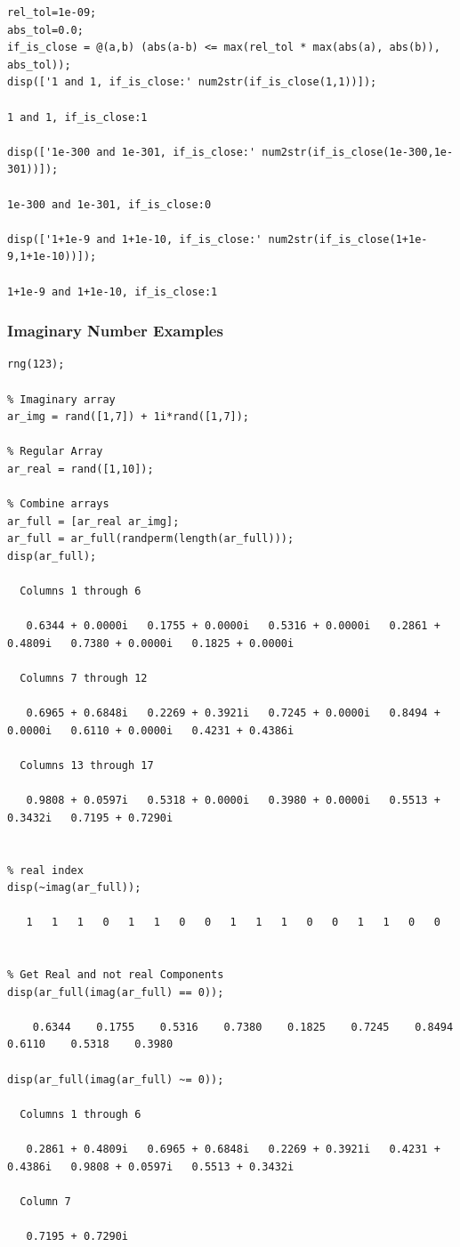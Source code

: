 \documentclass[
]{book}
\begin{document}
\begin{verbatim}
rel_tol=1e-09;
abs_tol=0.0;
if_is_close = @(a,b) (abs(a-b) <= max(rel_tol * max(abs(a), abs(b)), abs_tol));
disp(['1 and 1, if_is_close:' num2str(if_is_close(1,1))]);

1 and 1, if_is_close:1

disp(['1e-300 and 1e-301, if_is_close:' num2str(if_is_close(1e-300,1e-301))]);

1e-300 and 1e-301, if_is_close:0

disp(['1+1e-9 and 1+1e-10, if_is_close:' num2str(if_is_close(1+1e-9,1+1e-10))]);

1+1e-9 and 1+1e-10, if_is_close:1
\end{verbatim}

\hypertarget{imaginary-number-examples}{%
\subsubsection{Imaginary Number Examples}\label{imaginary-number-examples}}

\begin{verbatim}
rng(123);

% Imaginary array
ar_img = rand([1,7]) + 1i*rand([1,7]);

% Regular Array
ar_real = rand([1,10]);

% Combine arrays
ar_full = [ar_real ar_img];
ar_full = ar_full(randperm(length(ar_full)));
disp(ar_full);

  Columns 1 through 6

   0.6344 + 0.0000i   0.1755 + 0.0000i   0.5316 + 0.0000i   0.2861 + 0.4809i   0.7380 + 0.0000i   0.1825 + 0.0000i

  Columns 7 through 12

   0.6965 + 0.6848i   0.2269 + 0.3921i   0.7245 + 0.0000i   0.8494 + 0.0000i   0.6110 + 0.0000i   0.4231 + 0.4386i

  Columns 13 through 17

   0.9808 + 0.0597i   0.5318 + 0.0000i   0.3980 + 0.0000i   0.5513 + 0.3432i   0.7195 + 0.7290i


% real index
disp(~imag(ar_full));

   1   1   1   0   1   1   0   0   1   1   1   0   0   1   1   0   0


% Get Real and not real Components
disp(ar_full(imag(ar_full) == 0));

    0.6344    0.1755    0.5316    0.7380    0.1825    0.7245    0.8494    0.6110    0.5318    0.3980

disp(ar_full(imag(ar_full) ~= 0));

  Columns 1 through 6

   0.2861 + 0.4809i   0.6965 + 0.6848i   0.2269 + 0.3921i   0.4231 + 0.4386i   0.9808 + 0.0597i   0.5513 + 0.3432i

  Column 7

   0.7195 + 0.7290i
\end{verbatim}
\end{document}
